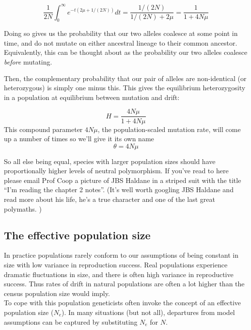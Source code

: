 \begin{equation}
\frac{1}{2N} \int_0^{\infty} e^{-t(2\mu+1/(2N))} dt =
\frac{1/(2N)}{1/(2N)+2\mu} = \frac{1}{1+4N\mu}
\end{equation}

Doing so gives us the probability that our two alleles coalesce at some point
in time, and do not mutate on either ancestral lineage to their common
ancestor. Equivalently, this can be thought about as the probability our two
alleles coalesce \emph{before} mutating. 

Then, the complementary probability that our pair of alleles are non-identical
(or heterozygous) is simply one minus this. This gives the equilibrium
heterozygosity in a population at equilibrium between mutation and drift:

\begin{equation}
  H = \frac{4N\mu}{1+4N\mu} \label{eqn:hetero}
\end{equation}
This compound parameter $4N\mu$, the population-scaled mutation rate,
will come up a number of times so we'll give it its own name
\begin{equation}
\theta = 4N\mu
\end{equation}

So all else being equal, species with larger population sizes should
have proportionally higher levels of neutral polymorphism.  If you've read to here please email Prof Coop a picture of JBS Haldane
in a striped suit with the title ``I'm reading the chapter 2 notes''. (It's well worth googling JBS Haldane and read more about his life,
he's a true character and one of the last great polymaths. )

\subsection{The effective population size}
In practice populations rarely conform to our assumptions of being
constant in size with low variance in reproduction success. Real
populations experience dramatic fluctuations in size, and there is
often high variance in reproductive success. Thus rates of drift in
natural populations are often a lot higher than the census population
size would imply.\\

To cope with this population geneticists often invoke the concept of
an effective population size ($N_e$). In many situations (but not all), departures from model assumptions can be captured by substituting $N_e$ for $N$.

